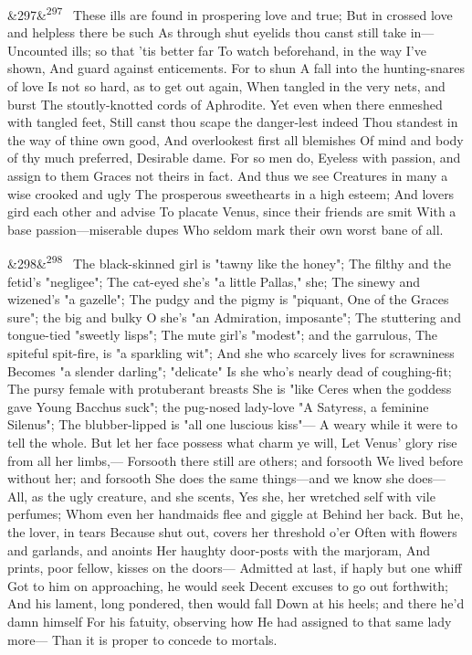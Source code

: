 \documentclass[12pt]{article}
\newcommand{\para}[1][]{\par\noindent\ifx&#1&\else\textsuperscript{\footnotesize #1}~\fi}
\begin{document}
\para[297] These ills are found in prospering love and true; But in crossed love and helpless there be such As through shut eyelids thou canst still take in--- Uncounted ills; so that 'tis better far To watch beforehand, in the way I've shown, And guard against enticements. For to shun A fall into the hunting-snares of love Is not so hard, as to get out again, When tangled in the very nets, and burst The stoutly-knotted cords of Aphrodite. Yet even when there enmeshed with tangled feet, Still canst thou scape the danger-lest indeed Thou standest in the way of thine own good, And overlookest first all blemishes Of mind and body of thy much preferred, Desirable dame. For so men do, Eyeless with passion, and assign to them Graces not theirs in fact. And thus we see Creatures in many a wise crooked and ugly The prosperous sweethearts in a high esteem; And lovers gird each other and advise To placate Venus, since their friends are smit With a base passion---miserable dupes Who seldom mark their own worst bane of all.

\para[298] The black-skinned girl is "tawny like the honey"; The filthy and the fetid's "negligee"; The cat-eyed she's "a little Pallas," she; The sinewy and wizened's "a gazelle"; The pudgy and the pigmy is "piquant, One of the Graces sure"; the big and bulky O she's "an Admiration, imposante"; The stuttering and tongue-tied "sweetly lisps"; The mute girl's "modest"; and the garrulous, The spiteful spit-fire, is "a sparkling wit"; And she who scarcely lives for scrawniness Becomes "a slender darling"; "delicate" Is she who's nearly dead of coughing-fit; The pursy female with protuberant breasts She is "like Ceres when the goddess gave Young Bacchus suck"; the pug-nosed lady-love "A Satyress, a feminine Silenus"; The blubber-lipped is "all one luscious kiss"--- A weary while it were to tell the whole. But let her face possess what charm ye will, Let Venus' glory rise from all her limbs,--- Forsooth there still are others; and forsooth We lived before without her; and forsooth She does the same things---and we know she does--- All, as the ugly creature, and she scents, Yes she, her wretched self with vile perfumes; Whom even her handmaids flee and giggle at Behind her back. But he, the lover, in tears Because shut out, covers her threshold o'er Often with flowers and garlands, and anoints Her haughty door-posts with the marjoram, And prints, poor fellow, kisses on the doors--- Admitted at last, if haply but one whiff Got to him on approaching, he would seek Decent excuses to go out forthwith; And his lament, long pondered, then would fall Down at his heels; and there he'd damn himself For his fatuity, observing how He had assigned to that same lady more--- Than it is proper to concede to mortals.
\end{document}
